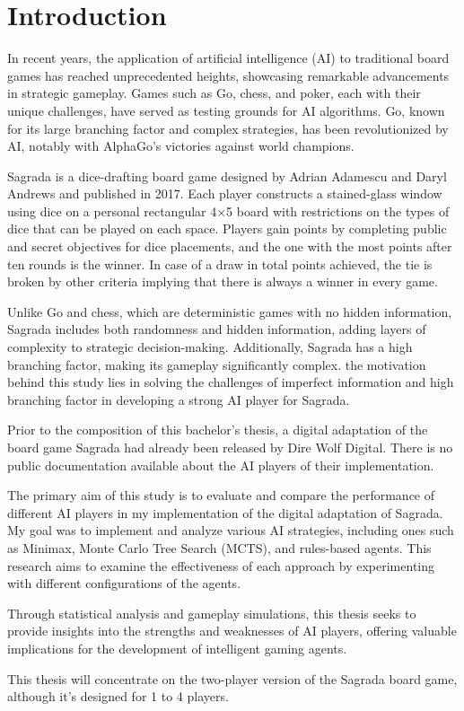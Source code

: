 \chapter*{Introduction}


In recent years, the application of artificial intelligence (AI) to traditional board games 
has reached unprecedented heights, showcasing remarkable advancements in strategic gameplay. 
Games such as Go, chess, and poker, each with their unique challenges, have served as testing 
grounds for AI algorithms. Go, known for its large branching factor and complex strategies, 
has been revolutionized by AI, notably with AlphaGo's victories against world champions. 

Sagrada is a dice-drafting board game designed by Adrian Adamescu and Daryl Andrews and published in 2017.
Each player constructs a stained-glass window using dice on a personal rectangular 4×5 board with restrictions 
on the types of dice that can be played on each space. Players gain points by completing public and secret objectives 
for dice placements, and the one with the most points after ten rounds is the winner. In case of a draw in total points
achieved, the tie is broken by other criteria implying that there is always a winner in every game.

Unlike Go and chess, which are deterministic games with no hidden information, Sagrada includes both randomness and hidden information, 
adding layers of complexity to strategic decision-making. Additionally, Sagrada has a high branching factor, 
making its gameplay significantly complex. the motivation behind this study lies in solving the challenges of imperfect information and 
high branching factor in developing a strong AI player for Sagrada.

Prior to the composition of this bachelor's thesis, a digital adaptation of the board game Sagrada had already been released 
by Dire Wolf Digital. There is no public documentation available about the AI players of their implementation.

The primary aim of this study is to evaluate and compare the performance of different AI players in 
my implementation of the digital adaptation of Sagrada. My goal was to implement and analyze various AI strategies, 
including ones such as Minimax, Monte Carlo Tree Search (MCTS), and rules-based agents. This research aims to 
examine the effectiveness of each approach by experimenting with different configurations of the agents.


Through statistical analysis and gameplay simulations, this thesis seeks to provide 
insights into the strengths and weaknesses of AI players, offering valuable implications for the 
development of intelligent gaming agents. 

This thesis will concentrate on the two-player version of the Sagrada board game, although it's designed for 1 to 4 players.